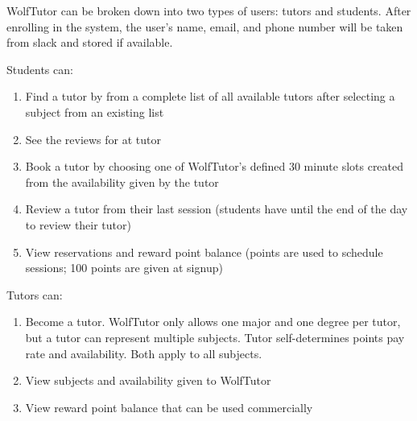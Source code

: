 WolfTutor can be broken down into two types of users: tutors and students.
After enrolling in the system, the user's name, email, and phone number will be taken from slack and stored if available.

Students can:
\begin{enumerate}
  \item Find a tutor by from a complete list of all available tutors after selecting a subject from an existing list
  \item See the reviews for at tutor
  \item Book a tutor by choosing one of WolfTutor's defined 30 minute slots created from the availability given by the tutor
  \item Review a tutor from their last session (students have until the end of the day to review their tutor)
  \item View reservations and reward point balance (points are used to schedule sessions; 100 points are given at signup)
\end{enumerate}

Tutors can:
\begin{enumerate}
  \item Become a tutor. WolfTutor only allows one major and one degree per tutor, but a tutor can represent multiple subjects. Tutor self-determines points pay rate and availability. Both apply to all subjects.
  \item View subjects and availability given to WolfTutor
  \item View reward point balance that can be used commercially
\end{enumerate}

